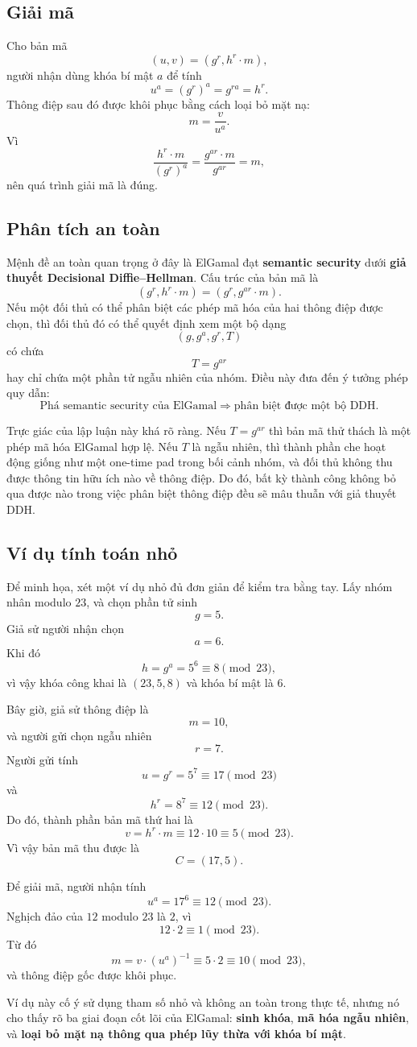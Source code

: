 \subsection{Giải mã}

Cho bản mã
\[
(u,v) = (g^r,h^r \cdot m),
\]
người nhận dùng khóa bí mật $a$ để tính
\[
u^a = (g^r)^a = g^{ra} = h^r.
\]
Thông điệp sau đó được khôi phục bằng cách loại bỏ mặt nạ:
\[
m = \frac{v}{u^a}.
\]
Vì
\[
\frac{h^r \cdot m}{(g^r)^a} = \frac{g^{ar}\cdot m}{g^{ar}} = m,
\]
nên quá trình giải mã là đúng.

\subsection{Phân tích an toàn}

Mệnh đề an toàn quan trọng ở đây là ElGamal đạt \textbf{semantic security} dưới \textbf{giả thuyết Decisional Diffie--Hellman}. Cấu trúc của bản mã là
\[
(g^r, h^r \cdot m) = (g^r, g^{ar}\cdot m).
\]
Nếu một đối thủ có thể phân biệt các phép mã hóa của hai thông điệp được chọn, thì đối thủ đó có thể quyết định xem một bộ dạng
\[
(g,g^a,g^r,T)
\]
có chứa
\[
T = g^{ar}
\]
hay chỉ chứa một phần tử ngẫu nhiên của nhóm. Điều này đưa đến ý tưởng phép quy dẫn:
\[
\text{Phá semantic security của ElGamal} \Longrightarrow \text{phân biệt được một bộ DDH}.
\]

Trực giác của lập luận này khá rõ ràng. Nếu $T=g^{ar}$ thì bản mã thử thách là một phép mã hóa ElGamal hợp lệ. Nếu $T$ là ngẫu nhiên, thì thành phần che hoạt động giống như một one-time pad trong bối cảnh nhóm, và đối thủ không thu được thông tin hữu ích nào về thông điệp. Do đó, bất kỳ thành công không bỏ qua được nào trong việc phân biệt thông điệp đều sẽ mâu thuẫn với giả thuyết DDH.

\subsection{Ví dụ tính toán nhỏ}

Để minh họa, xét một ví dụ nhỏ đủ đơn giản để kiểm tra bằng tay. Lấy nhóm nhân modulo $23$, và chọn phần tử sinh
\[
g = 5.
\]
Giả sử người nhận chọn
\[
a = 6.
\]
Khi đó
\[
h = g^a = 5^6 \equiv 8 \pmod{23},
\]
vì vậy khóa công khai là $(23,5,8)$ và khóa bí mật là $6$.

Bây giờ, giả sử thông điệp là
\[
m = 10,
\]
và người gửi chọn ngẫu nhiên
\[
r = 7.
\]
Người gửi tính
\[
u = g^r = 5^7 \equiv 17 \pmod{23}
\]
và
\[
h^r = 8^7 \equiv 12 \pmod{23}.
\]
Do đó, thành phần bản mã thứ hai là
\[
v = h^r \cdot m \equiv 12 \cdot 10 \equiv 5 \pmod{23}.
\]
Vì vậy bản mã thu được là
\[
C = (17,5).
\]

Để giải mã, người nhận tính
\[
u^a = 17^6 \equiv 12 \pmod{23}.
\]
Nghịch đảo của $12$ modulo $23$ là $2$, vì
\[
12 \cdot 2 \equiv 1 \pmod{23}.
\]
Từ đó
\[
m = v \cdot (u^a)^{-1} \equiv 5 \cdot 2 \equiv 10 \pmod{23},
\]
và thông điệp gốc được khôi phục.

Ví dụ này cố ý sử dụng tham số nhỏ và không an toàn trong thực tế, nhưng nó cho thấy rõ ba giai đoạn cốt lõi của ElGamal: \textbf{sinh khóa}, \textbf{mã hóa ngẫu nhiên}, và \textbf{loại bỏ mặt nạ thông qua phép lũy thừa với khóa bí mật}.
